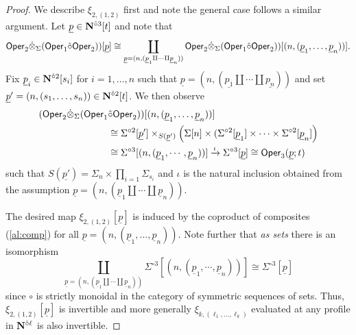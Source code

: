 \begin{proof}
We describe $\xi_{2,(1,2)}$ first and note the general case follows a similar argument. Let $\underline{p}\in \mathbf{N}^{\hat{\circ}3}[t]$ and note that \[ 
    \mathsf{Oper}_2 \dot{\otimes}_{\Sigma}  (\mathsf{Oper}_1 \hat{\circ} \mathsf{Oper}_2) )[\underline{p}] \cong \coprod_{\underline{p}=(n,(\underline{p}_1 \amalg \cdots \amalg \underline{p}_n))} \mathsf{Oper}_2 \dot{\otimes}_{\Sigma}  (\mathsf{Oper}_1 \hat{\circ} \mathsf{Oper}_2) )[(n, (\underline{p}_1,\dots,\underline{p}_n))]. \] 
Fix $\underline{p}_i\in \mathbf{N}^{\hat{\circ}2}[s_i]$ for $i=1,\dots,n$ such that $\underline{p}=(n, (\underline{p_1} \amalg \cdots \amalg \underline{p_n}))$ and set $\underline{p}'=(n,(s_1,\dots,s_n))\in \mathbf{N}^{\hat{\circ}2}[t]$. We then observe
\begin{align} \label{al:comp}
    (\mathsf{Oper}_2 \dot{\otimes}_{\Sigma}  (\mathsf{Oper}_1  &\hat{\circ} \mathsf{Oper}_2  ) )[(n, (\underline{p}_1,\dots,\underline{p}_n))]
    \\
    &\cong \Sigma^{\circ 2}[\underline{p}'] \times_{S(\underline{p}')} \left( \Sigma[n] \times ( \Sigma^{\circ 2} [\underline{p}_1] \times \cdots \times \Sigma^{\circ 2}[\underline{p}_n] \right) \nonumber
    \\
    &\cong  \Sigma^{\circ 3} [(n, (\underline{p}_1,\cdots,\underline{p}_n))] \xrightarrow{\iota} \Sigma^{\circ 3}[\underline{p}] \cong \mathsf{Oper}_3(\underline{p};t)\nonumber
\end{align}
such that $S(\underline{p'})=\Sigma_n \times \prod_{i=1} \Sigma_{s_i}$ and $\iota$ is the natural inclusion obtained from the assumption $\underline{p}=(n, (\underline{p}_1 \amalg \cdots \amalg \underline{p}_n))$.

The desired map $\xi_{2,(1,2)}[\underline{p}]$ is induced by the coproduct of composites (\ref{al:comp}) for all $\underline{p}=(n,(\underline{p}_1,\dots,\underline{p}_n))$. Note further that \textit{as sets} there is an isomorphism \[ 
    \coprod_{\underline{p}=(n,(\underline{p}_1 \amalg \cdots \amalg \underline{p}_n))} \Sigma^{\circ 3} [(n,(\underline{p}_1,\cdots, \underline{p}_n))] \cong \Sigma^{\circ 3}[\underline{p}]
\] 
since $\circ$ is strictly monoidal in the category of symmetric sequences of sets. Thus, $\xi_{2,(1,2)}[\underline{p}]$ is invertible and more generally $\xi_{k,(\ell_1,\dots,\ell_k)}$ evaluated at any profile in $\mathbf{N}^{\hat{\circ}\ell}$ is also invertible.


\end{proof}
